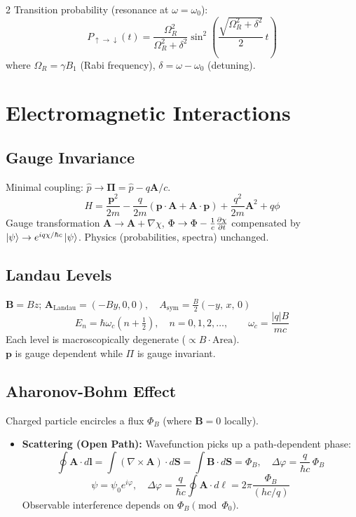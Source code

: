 \documentclass[9pt,a4paper]{article} %
\newcommand{\bs}[1]{\symbf{#1}}\usepackage{empheq}   %
\newcommand{\phat}{\hat{p}}
\begin{document}
\begin{multicols}{2}
Transition probability (resonance at $\omega=\omega_0$):
\[
P_{\uparrow\to\downarrow}(t)=\frac{\Omega_R^2}{\Omega_R^2+\delta^2}\sin^2\!\left(\frac{\sqrt{\Omega_R^2+\delta^2}}{2}\,t\right)
\]
where $\Omega_R=\gamma B_1$ (Rabi frequency), $\delta=\omega-\omega_0$ (detuning).


\section{Electromagnetic Interactions}

\subsection{Gauge Invariance}
Minimal coupling: $\phat\to\bs{\Pi}=\phat-q\mathbf{A}/c$.
\[
H = \frac{\mathbf{p}^2}{2m}
- \frac{q}{2m} \left( \mathbf{p}\cdot\mathbf{A} + \mathbf{A}\cdot\mathbf{p} \right)
+ \frac{q^2}{2m} \mathbf{A}^2
+ q \phi
\]
Gauge transformation $\mathbf{A}\to\mathbf{A}+\nabla\chi$, $\Phi\to\Phi-\frac{1}{c}\pdv{\chi}{t}$ compensated by $\ket{\psi}\to e^{iq\chi/\hbar c}\ket{\psi}$.  Physics (probabilities, spectra) unchanged.

\subsection{Landau Levels}
$\mathbf{B}=B\hat{z}$; \quad $\mathbf{A}_{\text{Landau}}=(-By,0,0),\quad A_{\text{sym}}= \frac{B}{2}(-y,\, x,\, 0)$
\[
E_{n}=\hbar\omega_c\!\left(n+\tfrac{1}{2}\right),\quad n=0,1,2,\ldots,\qquad \omega_c=\frac{|q|B}{mc}
\]
Each level is macroscopically degenerate ($\propto B\cdot\text{Area}$).\\
$\textbf{p}$ is gauge dependent while $\Pi$ is gauge invariant.
\subsection{Aharonov-Bohm Effect}
Charged particle encircles a flux $\Phi_B$ (where $\mathbf{B}=0$ locally).
\begin{itemize}
    \item \textbf{Scattering (Open Path):} Wavefunction picks up a path-dependent phase:
    \[\oint \mathbf{A}\cdot d\mathbf{l}
=
\int (\nabla \times \mathbf{A})\cdot d\mathbf{S}
=
\int \mathbf{B}\cdot d\mathbf{S}
=
\Phi_B,\quad
\Delta \varphi
=
\frac{q}{\hbar c}\,\Phi_B
\]
    \[
    \psi = \psi_0 e^{i\varphi}, \quad \Delta\varphi = \frac{q}{\hbar c} \oint \mathbf{A} \cdot d\bs{\ell} = 2\pi \frac{\Phi_B}{(hc/q)}
    \]
    Observable interference depends on $\Phi_B \pmod{\Phi_0}$.


\end{itemize}
\end{multicols}
\end{document}
